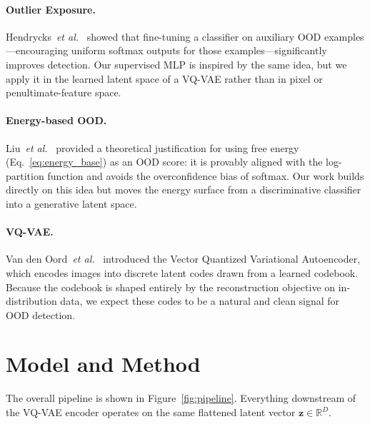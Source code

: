 \documentclass[10pt,twocolumn,letterpaper]{article}
\begin{document}
\paragraph{Outlier Exposure.}
Hendrycks~\emph{et al.}~\cite{hendrycks2019outlier} showed that
fine-tuning a classifier on auxiliary OOD examples---encouraging uniform
softmax outputs for those examples---significantly improves detection.
Our supervised MLP is inspired by the same idea, but we apply it in
the learned latent space of a VQ-VAE rather than in pixel or
penultimate-feature space.

\paragraph{Energy-based OOD.}
Liu~\emph{et al.}~\cite{liu2020energy} provided a theoretical justification
for using free energy (Eq.~\ref{eq:energy_base}) as an OOD score: it is
provably aligned with the log-partition function and avoids the
overconfidence bias of softmax. Our work builds directly on this idea
but moves the energy surface from a discriminative classifier into a
generative latent space.

\paragraph{VQ-VAE.}
Van den Oord~\emph{et al.}~\cite{oord2017vqvae} introduced the
Vector Quantized Variational Autoencoder, which encodes images into
discrete latent codes drawn from a learned codebook. Because the codebook
is shaped entirely by the reconstruction objective on in-distribution
data, we expect these codes to be a natural and clean signal for OOD
detection.

\section{Model and Method}

The overall pipeline is shown in Figure~\ref{fig:pipeline}.
Everything downstream of the VQ-VAE encoder operates on the same
flattened latent vector $\mathbf{z} \in \mathbb{R}^D$.
\end{document}
